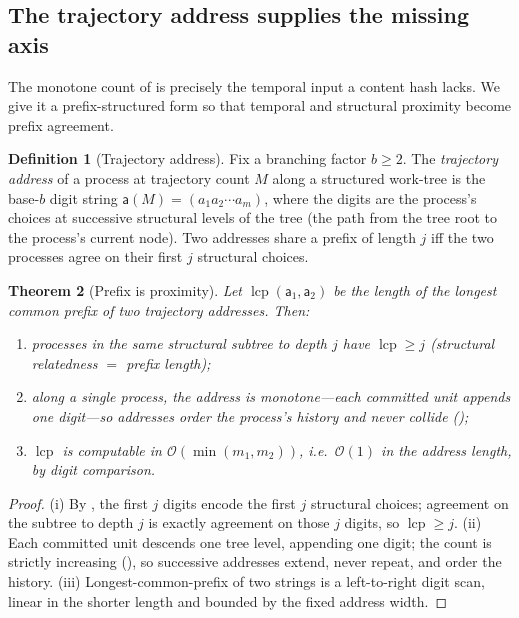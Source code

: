 \documentclass[twocolumn,10pt,a4paper]{article}
\theoremstyle{thmstyle}
\newtheorem{theorem}{Theorem}[section]
\theoremstyle{definition}
\newtheorem{definition}[theorem]{Definition}
\theoremstyle{remark}
\newcommand{\Mcount}{M}
\newcommand{\Addr}{\mathsf{a}}
\DeclareMathOperator{\lcp}{lcp}
\begin{document}
\subsection{The trajectory address supplies the missing axis}

The monotone count of  is precisely the temporal input a
content hash lacks. We give it a prefix-structured form so that temporal
and structural proximity become prefix agreement.

\begin{definition}[Trajectory address]
\label{def:address}
Fix a branching factor $b\ge 2$. The \emph{trajectory address} of a
process at trajectory count $\Mcount$ along a structured work-tree is the
base-$b$ digit string $\Addr(\Mcount)=(a_1 a_2\cdots a_m)$, where the
digits are the process's choices at successive structural levels of the
tree (the path from the tree root to the process's current node). Two
addresses share a prefix of length $j$ iff the two processes agree on
their first $j$ structural choices.
\end{definition}

\begin{theorem}[Prefix is proximity]
\label{thm:prefix}
Let $\lcp(\Addr_1,\Addr_2)$ be the length of the longest common prefix of
two trajectory addresses. Then:
\begin{enumerate}[label=\textup{(\roman*)},leftmargin=2.2em,itemsep=2pt]
\item processes in the same structural subtree to depth $j$ have
$\lcp\ge j$ (structural relatedness $=$ prefix length);
\item along a single process, the address is monotone---each committed
unit appends one digit---so addresses order the process's history and
never collide ();
\item $\lcp$ is computable in $\mathcal{O}(\min(m_1,m_2))$, i.e.\
$\mathcal{O}(1)$ in the address length, by digit comparison.
\end{enumerate}
\end{theorem}

\begin{proof}
(i) By , the first $j$ digits encode the first $j$
structural choices; agreement on the subtree to depth $j$ is exactly
agreement on those $j$ digits, so $\lcp\ge j$. (ii) Each committed unit
descends one tree level, appending one digit; the count is strictly
increasing (\Cref{thm:monotone}), so successive addresses extend, never
repeat, and order the history. (iii) Longest-common-prefix of two strings
is a left-to-right digit scan, linear in the shorter length and bounded by
the fixed address width.
\end{proof}
\end{document}
